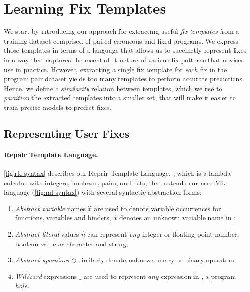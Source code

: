 \section{Learning Fix Templates}
\label{sec:templ-partition}

We start by introducing our approach for extracting useful \emph{fix templates}
from a training dataset comprised of paired erroneous and fixed programs.
%
We express those templates in terms of a language that allows us to succinctly
represent fixes in a way that captures the essential structure of various fix
patterns that novices use in practice.
%
However, extracting a single fix template for \emph{each} fix in the program
pair dataset yields too many templates to perform accurate predictions.
%
Hence, we define a \emph{similarity} relation between templates, which we use to
\emph{partition} the extracted templates into a smaller set, that will make it
easier to train precise models to predict fixes.



\subsection{Representing User Fixes}
\label{sec:templ-partition:lang}

\paragraph{Repair Template Language.}
\autoref{fig:rtl-syntax} describes our Repair Template Language, \repairLang,
which is a lambda calculus with integers, booleans, pairs, and lists, that
extends our core ML language \lang (\autoref{fig:ml-syntax}) with several
syntactic abstraction forms:

\begin{enumerate}
    \item \emph{Abstract variable} names $\hat{x}$  are used to denote variable
    occurrences for functions, variables and binders, \ie $\hat{x}$ denotes
    an unknown variable name in \repairLang;

    \item \emph{Abstract literal} values $\hat{n}$ can represent \emph{any}
    integer or floating point number, boolean value or character and string;

    \item \emph{Abstract operators} $\oplus$ similarly denote unknown unary or
    binary operators;

    \item \emph{Wildcard} expressions $\_$ are used to represent \emph{any}
    expression in \repairLang, \ie a program \emph{hole}.
\end{enumerate}

